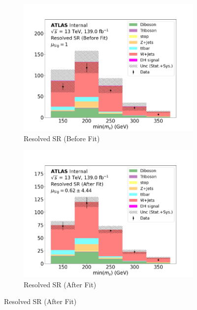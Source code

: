 \begin{figure}[h]
\begin{subfigure}{0.45\textwidth}
  \end{subfigure} \vspace{1em}
  \begin{subfigure}{0.45\textwidth}
    \includegraphics[width=\textwidth]{Figures/8/MonoSlep_monoSWWsemilep_zp2900_dm200_dh310/SR_Resolved_before.pdf}
    \caption{Resolved SR (Before Fit)}\label{fig:before_SR_merged_MonoSlep_monoSWWsemilep_zp2900_dm200_dh310}
  \end{subfigure} \hspace{1em}
  \begin{subfigure}{0.45\textwidth}
    \includegraphics[width=\textwidth]{Figures/8/MonoSlep_monoSWWsemilep_zp2900_dm200_dh310/SR_Resolved_after.pdf}
    \caption{Resolved SR (After Fit)}\label{fig:after_SR_merged_MonoSlep_monoSWWsemilep_zp2900_dm200_dh310}

\end{subfigure}
\end{figure}
